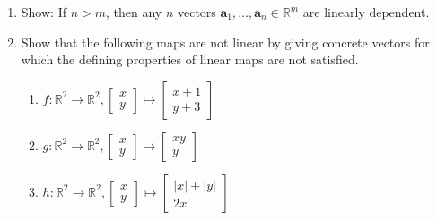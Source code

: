 \documentclass[12pt]{amsart}
\newcommand{\ba}{\mathbf{a}}
\newcommand{\bv}{\mathbf v}
\newcommand{\R}{\mathbb{R}}
\DeclareMathOperator{\Span}{Span}
\begin{document}
\begin{enumerate}
\item Show: If $n>m$, then any $n$ vectors $\ba_1,\dots,\ba_n\in\R^m$ are linearly dependent. %





\item
 Show that the following maps are not linear by giving concrete vectors for which the defining properties
 of linear maps are not satisfied.
\begin{enumerate}
\item
 $f: \R^2\to\R^2, \left[\begin{matrix} x \\ y \end{matrix}\right] \mapsto \left[\begin{matrix} x+1 \\ y+3 \end{matrix}\right]$
\item 
 $g: \R^2\to\R^2, \left[\begin{matrix} x \\ y \end{matrix}\right] \mapsto \left[\begin{matrix} xy \\ y \end{matrix}\right]$
\item 
 $h: \R^2\to\R^2, \left[\begin{matrix} x \\ y \end{matrix}\right] \mapsto \left[\begin{matrix} |x|+|y| \\ 2x \end{matrix}\right]$
\end{enumerate}


\end{enumerate}
\end{document}

